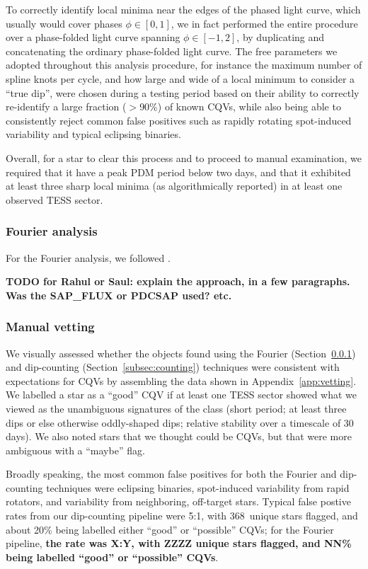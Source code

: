 \documentclass[11pt,twocolumn,tighten]{aastex63}
\newcommand{\nuniqdipflagged}{{368}} %
\begin{document}
To correctly identify local minima near the edges of the phased light
curve, which usually would cover phases $\phi \in [ 0,1 ]$, we in fact
performed the entire procedure over a phase-folded light curve
spanning $\phi \in [-1,2 ]$, by duplicating and concatenating the
ordinary phase-folded light curve.  The free parameters we adopted
throughout this analysis procedure, for instance the maximum number of
spline knots per cycle, and how large and wide of a local minimum to
consider a ``true dip'', were chosen during a testing period based on
their ability to correctly re-identify a large fraction ($>$90\%) of
known CQVs, while also being able to consistently reject common false
positives such as rapidly rotating spot-induced variability and
typical eclipsing binaries.

Overall, for a star to clear this process and to proceed to manual
examination, we required that it have a peak PDM period below two
days, and that it exhibited at least three sharp local minima (as
algorithmically reported) in at least one observed TESS sector.



\subsubsection{Fourier analysis}
\label{subsec:fourier}
For the Fourier analysis, we followed \citet{2019ApJ...876..127Z}.

{\bf TODO for Rahul or Saul: explain the approach, in a few
	paragraphs.  Was the SAP\_FLUX or PDCSAP used? etc. }

\subsubsection{Manual vetting}

We visually assessed whether the objects found using the Fourier
(Section~\ref{subsec:fourier}) and dip-counting
(Section~\ref{subsec:counting}) techniques were consistent with
expectations for CQVs by assembling the data shown in
Appendix~\ref{app:vetting}.
We labelled a star as a ``good'' CQV if at least one TESS sector
showed what we viewed as the unambiguous signatures of the class (short
period; at least three dips or else otherwise oddly-shaped dips;
relative stability over a timescale of 30\,days).
We also noted stars that we thought could be CQVs, but that were more
ambiguous with a ``maybe'' flag.

Broadly speaking, the most common false positives for both the Fourier
and dip-counting techniques were eclipsing binaries, spot-induced
variability from rapid rotators, and variability from neighboring,
off-target stars.  Typical false postive rates from our dip-counting
pipeline were 5:1, with \nuniqdipflagged\ unique stars flagged, and
about 20\% being labelled either ``good'' or ``possible'' CQVs; for
the Fourier pipeline, {\bf the rate was X:Y, with ZZZZ unique stars
flagged, and NN\% being labelled ``good'' or ``possible'' CQVs}.
\end{document}
